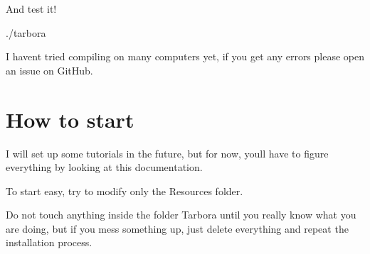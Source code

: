 And test it! 
\begin{DoxyCode}
./tarbora
\end{DoxyCode}


I haven\textquotesingle{}t tried compiling on many computers yet, if you get any errors please open an issue on Git\+Hub.\hypertarget{index_getting_started}{}\section{How to start}\label{index_getting_started}
I will set up some tutorials in the future, but for now, you\textquotesingle{}ll have to figure everything by looking at this documentation.

To start easy, try to modify only the Resources folder.

Do not touch anything inside the folder Tarbora until you really know what you are doing, but if you mess something up, just delete everything and repeat the installation process. 